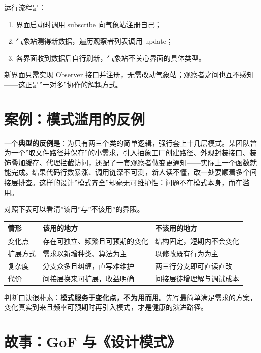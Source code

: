 \documentclass[
]{ctexbook}
\providecommand{\tightlist}{\setlength{\itemsep}{0pt}\setlength{\parskip}{0pt} }
\newcounter{none}
\begin{document}
运行流程是：

\begin{enumerate}
\def\labelenumi{\arabic{enumi}.}
\tightlist
\item
  界面启动时调用 subscribe 向气象站注册自己；
\item
  气象站测得新数据，遍历观察者列表调用 update；
\item
  各界面收到数据后自行刷新，气象站不关心界面的具体类型。
\end{enumerate}

新界面只需实现 Observer
接口并注册，无需改动气象站；观察者之间也互不感知------这正是''一对多''协作的解耦方式。

\section{案例：模式滥用的反例}\label{ux6848ux4f8bux6a21ux5f0fux6ee5ux7528ux7684ux53cdux4f8b}

一个\textbf{典型的反例}是：为只有两三个类的简单逻辑，强行套上十几层模式。某团队曾为一个''取文件路径并保存''的小需求，引入抽象工厂创建路径、外观封装接口、装饰叠加缓存、代理拦截访问，还配了一套观察者做变更通知------实际上一个函数就能完成。结果代码行数暴涨、调用链深不可测，新人读不懂，改一处要顺着多个间接层排查。这样的设计''模式齐全''却毫无可维护性：问题不在模式本身，而在滥用。

对照下表可以看清''该用''与''不该用''的界限。

{\def\LTcaptype{none} %
\begin{longtable}[]{@{}lll@{}}
\toprule\noalign{}
情形 & 该用的地方 & 不该用的地方 \\
\midrule\noalign{}
\endhead
\bottomrule\noalign{}
\endlastfoot
变化点 & 存在可独立、频繁且可预期的变化 & 结构固定，短期内不会变化 \\
扩展方式 & 需求以新增种类、算法为主 & 以修改既有行为为主 \\
复杂度 & 分支众多且纠缠，直写难维护 & 两三行分支即可直读直改 \\
代价 & 间接层换来可扩展，收益明确 & 间接层徒增理解与调试成本 \\
\end{longtable}
}

判断口诀很朴素：\textbf{模式服务于变化点，不为用而用}。先写最简单满足需求的方案，变化真实到来且频率可预期时再引入模式，才是健康的演进路径。

\section{故事：GoF
与《设计模式》}\label{ux6545ux4e8bgof-ux4e0eux8bbeux8ba1ux6a21ux5f0f}
\end{document}
